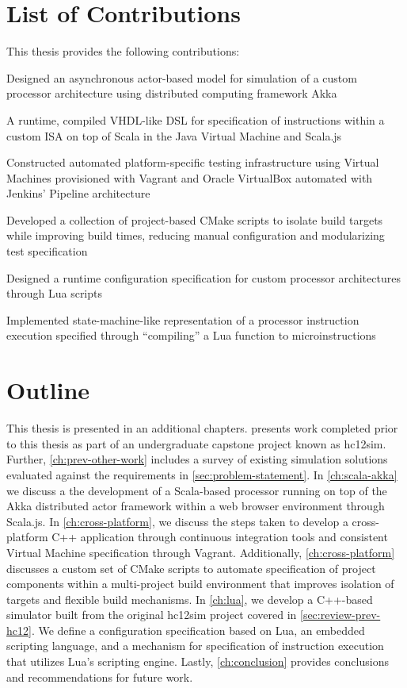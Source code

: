 \section{List of Contributions}

This thesis provides the following contributions:
\begin{listing}
    \item Designed an asynchronous actor-based model for simulation of a custom processor architecture using distributed computing framework Akka
    \item A runtime, compiled VHDL-like DSL for specification of instructions within a custom ISA on top of Scala in the Java Virtual Machine and Scala.js
    \item Constructed automated platform-specific testing infrastructure using Virtual Machines provisioned with Vagrant and Oracle VirtualBox automated with Jenkins' Pipeline architecture
    \item Developed a collection of project-based CMake scripts to isolate build targets while improving build times, reducing manual configuration and modularizing test specification
    \item Designed a runtime configuration specification for custom processor architectures through Lua scripts
    \item Implemented state-machine-like representation of a processor instruction execution specified through ``compiling'' a Lua function to microinstructions
\end{listing}

\section{Outline} 

This thesis is presented in an additional  chapters.  presents work completed prior to this thesis as part of an undergraduate capstone project known as hc12sim. Further, \cref{ch:prev-other-work} includes a survey of existing simulation solutions evaluated against the requirements in \cref{sec:problem-statement}. In \cref{ch:scala-akka} we discuss a the development of a Scala-based processor running on top of the Akka distributed actor framework within a web browser environment through Scala.js. In \cref{ch:cross-platform}, we discuss the steps taken to develop a cross-platform C++ application through continuous integration tools and consistent Virtual Machine specification through Vagrant. Additionally, \cref{ch:cross-platform} discusses a custom set of CMake scripts to automate specification of project components within a multi-project build environment that improves isolation of targets  and flexible build mechanisms. In \cref{ch:lua}, we develop a C++-based simulator built from the original hc12sim project covered in \cref{sec:review-prev-hc12}. We define a configuration specification based on Lua, an embedded scripting language, and a mechanism for specification of instruction execution that utilizes Lua's scripting engine. Lastly, \cref{ch:conclusion} provides conclusions and recommendations for future work. 
